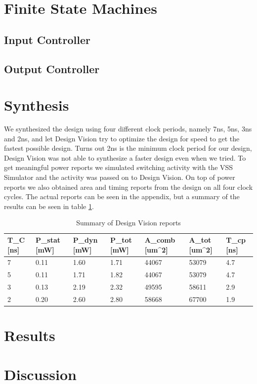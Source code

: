\documentclass[11pt,a4paper]{article}
\begin{document}
\section{Finite State Machines}
\subsection{Input Controller}

\subsection{Output Controller}


\FlowBarrier
\section{Synthesis}
We synthesized the design using four different clock periods, namely 7ns, 5ns, 3ns and 2ns, and let Design Vision try to optimize the design for speed to get the fastest possible design. Turns out 2ns is the minimum clock period for our design, Design Vision was not able to synthesize a faster design even when we tried. To get meaningful power reports we simulated switching activity with the VSS Simulator and the activity was passed on to Design Vision. On top of power reports we also obtained area and timing reports from the design on all four clock cycles. The actual reports can be seen in the appendix, but a summary of the results can be seen in table \ref{tab:synth}.

\begin{table}[h]
	\caption{Summary of Design Vision reports}
	\begin{center}
		\begin{tabular}{|l|l|l|l|l|l|l|} \hline
			\textbf{T}_{C} [ns]	& \textbf{P}_{stat}	[mW] & \textbf{P}_{dyn} [mW]	& \textbf{P}_{tot} [mW] & \textbf{A}_{comb} [um^2]& \textbf{A}_{tot} [um^2] & \textbf{T}_{cp} [ns] \\ \hline
			7 & 0.11 & 1.60 & 1.71 & 44067 & 53079 & 4.7 \\ \hline
			5 & 0.11 & 1.71 & 1.82 & 44067 & 53079 & 4.7 \\ \hline
			3 & 0.13 & 2.19 & 2.32 & 49595 & 58611 & 2.9 \\ \hline
			2 & 0.20 & 2.60 & 2.80 & 58668 & 67700 & 1.9 \\ \hline
			
		\end{tabular}
	\end{center}
	\label{tab:synth}
\end{table}

\FlowBarrier
\section{Results}

\section{Discussion}
\end{document}
